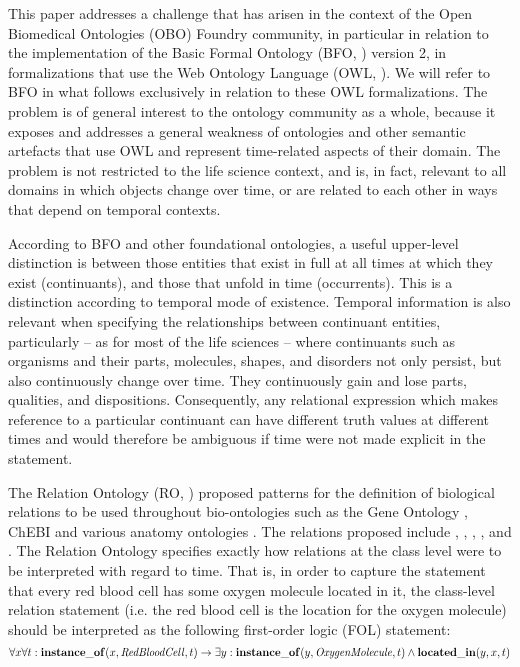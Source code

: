 


This paper addresses a challenge that has arisen in the context of the Open Biomedical Ontologies (OBO) Foundry \cite{Smith2007} community, in particular in relation to the implementation of the Basic Formal Ontology (BFO, \cite{BFO2:Graz}) version 2, in formalizations that use the Web Ontology Language (OWL, \cite{grau2008}). 
We will refer to BFO in what follows exclusively in relation to these OWL formalizations. 
The problem is of general interest to the %
ontology 
community as a whole, because it exposes and addresses a general weakness 
of ontologies and other semantic artefacts that
use OWL and represent time-related
aspects of their domain. 
The problem is not restricted to the life science context, and is, in fact, relevant to all domains in which objects change over time, or are related to each other in ways that depend on temporal contexts.   

According to BFO and other foundational ontologies, a useful upper-level distinction is between those entities that exist in full at all times at which they exist (continuants), and those that unfold in time (occurrents). This is a distinction according to temporal mode of existence. Temporal information is also relevant when specifying the relationships between continuant entities, particularly -- as for most of the life sciences -- where continuants such as organisms and their parts, molecules, shapes, and disorders not only persist, but also continuously change over time. They continuously gain and lose parts, qualities, and dispositions. Consequently, any relational expression which makes reference to a particular continuant can have different truth values at different times and would therefore be ambiguous if time were not made explicit in the statement. 

The Relation Ontology (RO, \cite{OBO:RO}) proposed patterns for the definition of biological relations to be used throughout bio-ontologies such as the Gene Ontology \cite{go2000}, ChEBI \cite{chebinar2013} and various anatomy ontologies \cite{uberon2012}. The relations proposed include 
, , , , and  . The Relation Ontology specifies exactly how relations at the class level were to be interpreted with regard to time. That is, in order to capture the statement that every red blood cell has some oxygen molecule located in it, the class-level relation statement    (i.e. the red blood cell is the location for the oxygen molecule) should be interpreted as the following first-order logic (FOL) statement: 
\begin{equation}
\forall x \forall t : \mathrm{\mathbf{instance\_of}}(x, \mathit{RedBloodCell}, t) \rightarrow 
\exists y : \mathrm{\mathbf{instance\_of}}(y, \mathit{OxygenMolecule}, t) \wedge \mathrm{\mathbf{located\_in}}(y, x, t)
\end{equation}

